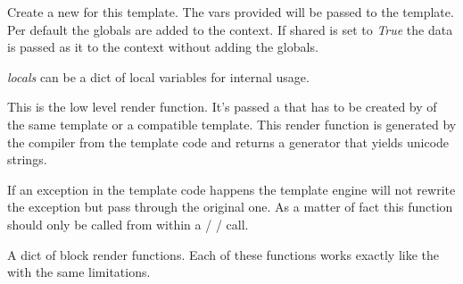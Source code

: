 \documentclass[a4paper,10pt,english]{sphinxmanual}
\begin{document}

\begin{fulllineitems}
\label{api:jinja2.Template.new_context}
Create a new  for this template.  The vars
provided will be passed to the template.  Per default the globals
are added to the context.  If shared is set to \emph{True} the data
is passed as it to the context without adding the globals.

\emph{locals} can be a dict of local variables for internal usage.

\end{fulllineitems}


\begin{fulllineitems}
\label{api:jinja2.Template.root_render_func}
This is the low level render function.  It's passed a 
that has to be created by {\hyperref[api:jinja2.Template.new_context]{}} of the same template or
a compatible template.  This render function is generated by the
compiler from the template code and returns a generator that yields
unicode strings.

If an exception in the template code happens the template engine will
not rewrite the exception but pass through the original one.  As a
matter of fact this function should only be called from within a
{\hyperref[api:jinja2.Template.render]{}} / {\hyperref[api:jinja2.Template.generate]{}} / {\hyperref[api:jinja2.Template.stream]{}} call.

\end{fulllineitems}


\begin{fulllineitems}
\label{api:jinja2.Template.blocks}
A dict of block render functions.  Each of these functions works exactly
like the {\hyperref[api:jinja2.Template.root_render_func]{}} with the same limitations.

\end{fulllineitems}
\end{document}
